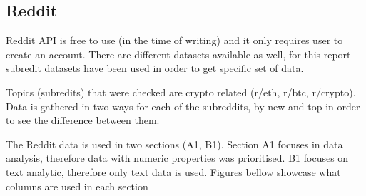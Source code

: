 \subsection{Reddit}\label{Reddit}

Reddit API \parencite{web:Reddit} is free to use (in the time of writing) and it only requires user to create an account. There are different datasets available as well, for this report subredit datasets have been used in order to get specific set of data. 

Topics (subredits) that were checked are crypto related (r/eth, r/btc, r/crypto). Data is gathered in two ways for each of the subreddits, by new and top in order to see the difference between them.

The Reddit data is used in two sections (A1, B1). Section A1 focuses in data analysis, therefore data with numeric properties was prioritised. B1 focuses on text analytic, therefore only text data is used. Figures bellow showcase what columns are used in each section
